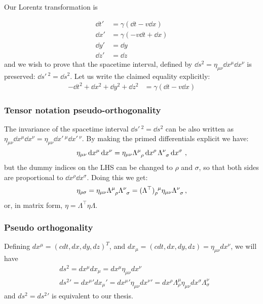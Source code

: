 \documentclass[main.tex]{subfiles}
\begin{document}
Our Lorentz transformation is

\begin{subequations}
\begin{align}
    \dd{t}' &= \gamma (\dd{t} - v \dd{x}) \\
    \dd{x}' &= \gamma (-v\dd{t} + \dd{x}) \\
    \dd{y}' &= \dd{y} \\
    \dd{z}' &= \dd{z}
\end{align}
\end{subequations}
%
and we wish to prove that the spacetime interval, defined by $\dd{s^2} = \eta_{\mu\nu} \dd{x^\mu}\dd{x^\nu}$ is preserved: $\dd{s'\,^2} = \dd{s^2}$.
Let us write the claimed equality explicitly:
%
\begin{subequations}
\begin{align}
    -\dd{t^2} + \dd{x^2}+ \dd{y^2}+ \dd{z^2}
    &= \gamma (\dd{t} - v \dd{x})
\end{align}
\end{subequations}


\subsubsection{Tensor notation pseudo-orthogonality}

The invariance of the spacetime interval $\dd{s'\,^2} = \dd{s^2}$ can be also written as \(\eta_{\mu\nu} \dd{x^\mu} \dd{x^\nu} = \eta_{\mu\nu} \dd{x'\,^\mu} \dd{x'\,^\nu}\). By making the primed differentials explicit we have:
%
\begin{equation}
  \eta_{\mu\nu} \dd{x^\mu} \dd{x^\nu}
  =
  \eta_{\mu\nu} \tensor{\Lambda}{^\mu_\rho} \dd{x^\rho} \tensor{\Lambda}{^\nu_\sigma} \dd{x^\sigma} \,,
\end{equation}
%
but the dummy indices on the LHS can be changed to \(\rho\) and \(\sigma\), so that both sides are proportional to  \(\dd{x^\rho}\dd{x^\sigma}\). Doing this we get:
%
\begin{equation}
  \eta_{\rho\sigma}
  =
  \eta_{\mu\nu} \tensor{\Lambda}{^\mu_\rho} \tensor{\Lambda}{^\nu_\sigma}
  =\tensor{(\Lambda^\top)}{_\rho^\mu} \eta_{\mu\nu} \tensor{\Lambda}{^\nu_\sigma} \,,
\end{equation}
%
or, in matrix form, \(\eta = \Lambda^\top \eta \Lambda\).
\subsubsection{Pseudo orthogonality}
Defining $dx^\mu=(cdt,dx,dy,dz)^T$, and $dx_\mu=(cdt,dx,dy,dz)=\eta_{\mu\nu}dx^\nu$, we will have
\begin{align}
&ds^2=dx^\mu dx_\mu=dx^\mu\eta_{\mu\nu}dx^\nu\nonumber\\
&ds^2'=dx^\mu' dx_\mu'=dx^\mu'\eta_{\mu\nu}dx^\nu'=dx^\rho\Lambda_\rho^\mu\eta_{\mu\nu}dx^\sigma\Lambda_\sigma^\nu
\end{align} and $ds^2=ds^2'$ is equivalent to our thesis.
\end{document}
